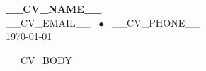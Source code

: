 \documentclass[11pt,a4paper]{article}
\begin{document}
{\Large\bfseries __CV_NAME__}\\
\noindent __CV_EMAIL__ ~$\bullet$~ __CV_PHONE__\\[0.6em]
{\color{gray}\today}\par\vspace{0.4em}

__CV_BODY__

\vfill
\end{document}
